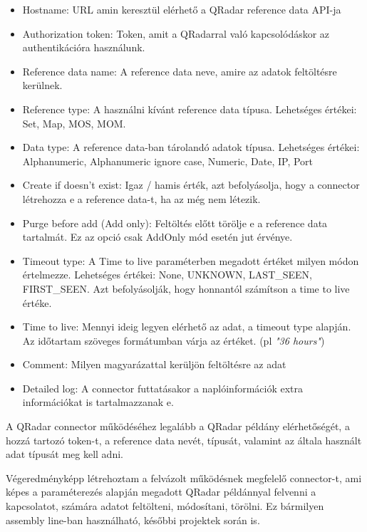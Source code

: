 \begin{itemize}
	\item Hostname: URL amin keresztül elérhető a QRadar reference data API-ja 
	
	\item Authorization token: Token, amit a QRadarral való kapcsolódáskor az authentikációra használunk.
	
	\item Reference data name: A reference data neve, amire az adatok feltöltésre kerülnek.
	
	\item Reference type: A használni kívánt reference data típusa. Lehetséges értékei: Set, Map, MOS, MOM.
	
	\item Data type: A reference data-ban tárolandó adatok típusa. Lehetséges értékei: Alphanumeric, Alphanumeric ignore case, Numeric, Date, IP, Port
	
	\item Create if doesn't exist: Igaz / hamis érték, azt befolyásolja, hogy a connector létrehozza e a reference data-t, ha az még nem létezik.
	
	\item Purge before add (Add only): Feltöltés előtt törölje e a reference data tartalmát. Ez az opció csak AddOnly mód esetén jut érvénye.
	
	\item Timeout type: A Time to live paraméterben megadott értéket milyen módon értelmezze. Lehetséges értékei: None, UNKNOWN, LAST\_SEEN, FIRST\_SEEN. Azt befolyásolják, hogy honnantól 
	számítson a time to live értéke.
	
	\item Time to live: Mennyi ideig legyen elérhető az adat, a timeout type alapján. Az időtartam szöveges formátumban várja az értéket. (pl \textit{"36 hours"})
	
	\item Comment: Milyen magyarázattal kerüljön feltöltésre az adat
	
	\item Detailed log: A connector futtatásakor a naplóinformációk extra információkat is tartalmazzanak e.
	
\end{itemize} 
A QRadar connector működéséhez legalább a QRadar példány elérhetőségét, a hozzá tartozó token-t, a reference data nevét, típusát, valamint az általa használt adat típusát meg kell adni.

Végeredményképp létrehoztam a felvázolt működésnek megfelelő connector-t, ami képes a paraméterezés alapján megadott QRadar példánnyal felvenni a kapcsolatot, számára adatot feltölteni, módosítani, törölni. Ez bármilyen assembly line-ban használható, későbbi projektek során is.

